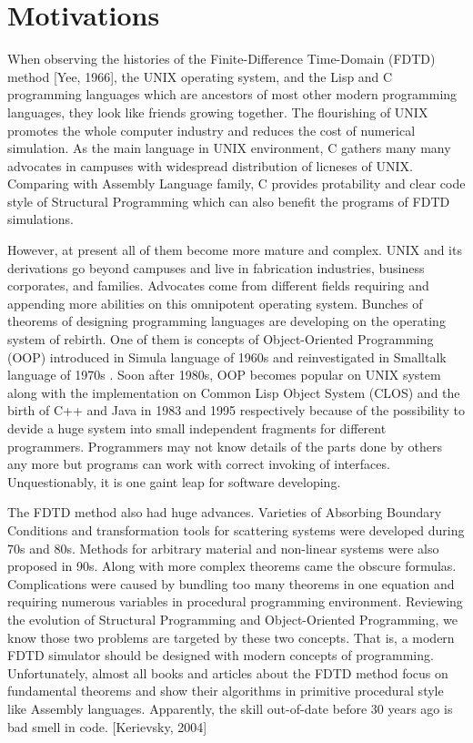 \section{Motivations}
When observing the histories of the Finite-Difference Time-Domain (FDTD) method [Yee, 1966], the UNIX operating system, and the Lisp and
C programming languages which are ancestors of most other modern programming languages, they look like friends growing
together. The flourishing of UNIX promotes the whole computer industry and reduces the cost of numerical simulation. As the
main language in UNIX environment, C gathers many many advocates in campuses with widespread distribution of licneses of
UNIX. Comparing with Assembly Language family, C provides protability and clear code style of Structural Programming
which can also benefit the programs of FDTD simulations.

However, at present all of them become more mature and complex. UNIX and its derivations go beyond campuses and live in
fabrication industries, business corporates, and families. Advocates come from different fields requiring and appending
more abilities on this omnipotent operating system. Bunches of theorems of designing programming languages are developing
on the operating system of rebirth. One of them is concepts of Object-Oriented Programming (OOP) introduced in Simula
language of 1960s and reinvestigated in Smalltalk language of 1970s \cite[Sebesta 2008]{sebesta}. Soon after 1980s, OOP
becomes popular on UNIX system along with the implementation on Common Lisp Object System (CLOS) and the birth of C++
and Java in 1983 and 1995 respectively because of the possibility to devide a huge system into small independent
fragments for different programmers. Programmers may not know details of the parts done by others any more but programs
can work with correct invoking of interfaces. Unquestionably, it is one gaint leap for software developing.

The FDTD method also had huge advances. Varieties of Absorbing Boundary Conditions and transformation tools for scattering systems
were developed during 70s and 80s. Methods for arbitrary material and non-linear systems were also proposed in 90s. Along
with more complex theorems came the obscure formulas. Complications were caused by bundling too many theorems in one
equation and requiring numerous variables in procedural programming environment. Reviewing the evolution of Structural
Programming and Object-Oriented Programming, we know those two problems are targeted by these two concepts. That is, a
modern FDTD simulator should be designed with modern concepts of programming. Unfortunately, almost all books and
articles about the FDTD method focus on fundamental theorems and show their algorithms in primitive procedural style like Assembly
languages. Apparently, the skill out-of-date before 30 years ago is bad smell in code. [Kerievsky, 2004]

